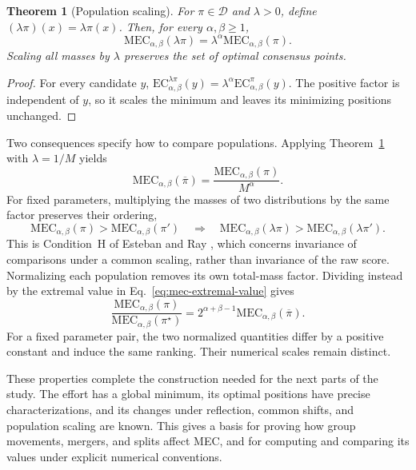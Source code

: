 \documentclass{article}
\theoremstyle{plain}
\newtheorem{theorem}{Theorem}
\theoremstyle{remark}
\begin{document}
\begin{theorem}[Population scaling]\label{th:mec-population-scaling}
For $\pi\in\mathcal{D}$ and $\lambda>0$, define $(\lambda\pi)(x)=\lambda\pi(x)$. Then, for every $\alpha,\beta\geq1$,
\begin{equation}\label{eq:mec-population-scaling}
\mathrm{MEC}_{\alpha,\beta}(\lambda\pi)
=\lambda^\alpha\mathrm{MEC}_{\alpha,\beta}(\pi).
\end{equation}
Scaling all masses by $\lambda$ preserves the set of optimal consensus points.
\end{theorem}
\begin{proof}
For every candidate $y$, $\mathrm{EC}_{\alpha,\beta}^{\lambda\pi}(y)=\lambda^\alpha\mathrm{EC}_{\alpha,\beta}^{\pi}(y)$. The positive factor is independent of $y$, so it scales the minimum and leaves its minimizing positions unchanged.
\end{proof}

Two consequences specify how to compare populations. Applying Theorem~\ref{th:mec-population-scaling} with $\lambda=1/M$ yields
\begin{equation}\label{eq:mec-mass-normalization}
\mathrm{MEC}_{\alpha,\beta}(\overline{\pi})
=\frac{\mathrm{MEC}_{\alpha,\beta}(\pi)}{M^\alpha}.
\end{equation}
For fixed parameters, multiplying the masses of two distributions by the same factor preserves their ordering,
\[
\mathrm{MEC}_{\alpha,\beta}(\pi)>\mathrm{MEC}_{\alpha,\beta}(\pi')
\quad\Longrightarrow\quad
\mathrm{MEC}_{\alpha,\beta}(\lambda\pi)>
\mathrm{MEC}_{\alpha,\beta}(\lambda\pi').
\]
This is Condition~H of Esteban and Ray \citep{esteban1994measurement}, which concerns invariance of comparisons under a common scaling, rather than invariance of the raw score. Normalizing each population removes its own total-mass factor. Dividing instead by the extremal value in Eq.~\eqref{eq:mec-extremal-value} gives
\[
\frac{\mathrm{MEC}_{\alpha,\beta}(\pi)}
     {\mathrm{MEC}_{\alpha,\beta}(\pi^\star)}
=2^{\alpha+\beta-1}\mathrm{MEC}_{\alpha,\beta}(\overline{\pi}).
\]
For a fixed parameter pair, the two normalized quantities differ by a positive constant and induce the same ranking. Their numerical scales remain distinct.

These properties complete the construction needed for the next parts of the study. The effort has a global minimum, its optimal positions have precise characterizations, and its changes under reflection, common shifts, and population scaling are known. This gives a basis for proving how group movements, mergers, and splits affect MEC, and for computing and comparing its values under explicit numerical conventions.
\end{document}
